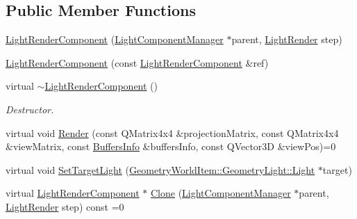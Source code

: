 \subsection*{Public Member Functions}
\begin{DoxyCompactItemize}
\item 
\mbox{\hyperlink{class_geometry_engine_1_1_light_utils_1_1_light_render_component_a21b64c341021e9573e3ca86e5c36de67}{Light\+Render\+Component}} (\mbox{\hyperlink{class_geometry_engine_1_1_light_utils_1_1_light_component_manager}{Light\+Component\+Manager}} $\ast$parent, \mbox{\hyperlink{namespace_geometry_engine_1_1_light_utils_ac3078de660742daceaa06bd9bc61d24a}{Light\+Render}} step)
\item 
\mbox{\hyperlink{class_geometry_engine_1_1_light_utils_1_1_light_render_component_ac118ddf14a5602d3342d1b498e38cdf6}{Light\+Render\+Component}} (const \mbox{\hyperlink{class_geometry_engine_1_1_light_utils_1_1_light_render_component}{Light\+Render\+Component}} \&ref)
\item 
\mbox{\label{class_geometry_engine_1_1_light_utils_1_1_light_render_component_a3ad6c125a9b2695140a3e0e1025809c1}} 
virtual \mbox{\hyperlink{class_geometry_engine_1_1_light_utils_1_1_light_render_component_a3ad6c125a9b2695140a3e0e1025809c1}{$\sim$\+Light\+Render\+Component}} ()
\begin{DoxyCompactList}\small\item\em Destructor. \end{DoxyCompactList}\item 
virtual void \mbox{\hyperlink{class_geometry_engine_1_1_light_utils_1_1_light_render_component_a025de8e4ec4345f0e7b303646a1d765b}{Render}} (const Q\+Matrix4x4 \&projection\+Matrix, const Q\+Matrix4x4 \&view\+Matrix, const \mbox{\hyperlink{class_geometry_engine_1_1_buffers_info}{Buffers\+Info}} \&buffers\+Info, const Q\+Vector3D \&view\+Pos)=0
\item 
virtual void \mbox{\hyperlink{class_geometry_engine_1_1_light_utils_1_1_light_render_component_a8c1e3c8aa5d8761793a9f39a16fe2f0b}{Set\+Target\+Light}} (\mbox{\hyperlink{class_geometry_engine_1_1_geometry_world_item_1_1_geometry_light_1_1_light}{Geometry\+World\+Item\+::\+Geometry\+Light\+::\+Light}} $\ast$target)
\item 
virtual \mbox{\hyperlink{class_geometry_engine_1_1_light_utils_1_1_light_render_component}{Light\+Render\+Component}} $\ast$ \mbox{\hyperlink{class_geometry_engine_1_1_light_utils_1_1_light_render_component_a0311667e3f6faa30c938303e8eaa9670}{Clone}} (\mbox{\hyperlink{class_geometry_engine_1_1_light_utils_1_1_light_component_manager}{Light\+Component\+Manager}} $\ast$parent, \mbox{\hyperlink{namespace_geometry_engine_1_1_light_utils_ac3078de660742daceaa06bd9bc61d24a}{Light\+Render}} step) const =0
\end{DoxyCompactItemize}
